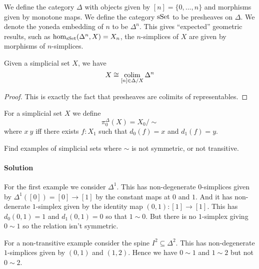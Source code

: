 We define the category $\Delta$ with objects given by $[n] = \{0, \ldots, n\}$ and morphisms given by monotone maps.
We define the category $\mathrm{sSet}$ to be presheaves on $\Delta$.
We denote the yoneda embedding of $n$ to be $\Delta^n$. 
This gives ``expected'' geometric results, such as $\hom_{\mathrm{sSet}}(\Delta^n, X) = X_n$, the $n$-simplices of $X$ are given by morphisms of $n$-simplices.

\begin{lemma}
    Given a simplicial set $X$, we have 
    \[X \cong \colim_{ [n] \in \Delta/X} \Delta^n \] 
\end{lemma}
\begin{proof}
    This is exactly the fact that presheaves are colimits of representables.
\end{proof}

\begin{definition}
    For a simplicial set $X$ we define 
    \[ \pi_0^\Delta(X) = X_0 / \sim\]
    where $x ~ y$ iff there exists $f : X_1$ such that $d_0(f) = x$ and $d_1(f) = y$.
\end{definition}

\begin{exercise}
    Find examples of simplicial sets where $\sim$ is not symmetric, or not transitive.
\paragraph{Solution}
    For the first example we consider $\Delta^1$.
    This has non-degenerate $0$-simplices given by $\Delta^1([0]) = [0] \to [1]$ by the constant maps at $0$ and $1$.
    And it has non-denerate $1$-simplex given by the identity map $(0,1) : [1] \to [1]$.
    This has $d_0 (0, 1) = 1$ and $d_1 (0, 1) = 0$ so that $1 \sim 0$.
    But there is no $1$-simplex giving $0 \sim 1$ so the relation isn't symmetric.
    
    For a non-transitive example consider the spine $I^2 \subseteq \Delta^2$.
    This has non-degenerate $1$-simplices given by $(0,1)$ and $(1,2)$.
    Hence we have $0 \sim 1$ and $1 \sim 2$ but not $0 \sim 2$.
\end{exercise}


